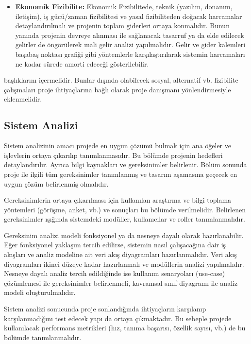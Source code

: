 \begin{itemize}
        \item \textbf{Ekonomik Fizibilite:} Ekonomik Fizibilitede, teknik (yazılım, donanım, iletişim), iş gücü/zaman fizibilitesi ve yasal fizibiliteden doğacak harcamalar detaylandırılmalı ve projenin toplam giderleri ortaya konmalıdır. Bunun yanında projenin devreye alınması ile sağlanacak tasarruf ya da elde edilecek gelirler de öngörülerek mali gelir analizi yapılmalıdır. Gelir ve gider kalemleri başabaş noktası grafiği gibi yöntemlerle karşılaştırılarak sistemin harcamaları ne kadar sürede amorti edeceği gösterilebilir.
        
    \end{itemize}

başlıklarını içermelidir. Bunlar dışında olabilecek sosyal, alternatif vb. fizibilite çalışmaları proje ihtiyaçlarına bağlı olarak proje danışmanı yönlendirmesiyle eklenmelidir.

\subsection{Sistem Analizi} 
Sistem analizinin amacı projede en uygun çözümü bulmak için ana öğeler ve işlevlerin ortaya çıkarılıp tanımlanmasıdır. Bu bölümde projenin hedefleri detaylandırılır. Ayrıca bilgi kaynakları ve gereksinimler belirlenir. Bölüm sonunda proje ile ilgili tüm gereksinimler tanımlanmış ve tasarım aşamasına geçecek en uygun çözüm belirlenmiş olmalıdır.
    
Gereksinimlerin ortaya çıkarılması için kullanılan araştırma ve bilgi toplama yöntemleri (görüşme, anket, vb.) ve sonuçları bu bölümde verilmelidir. Belirlenen gereksinimler ışığında sistemdeki modüller, kullanıcılar ve roller tanımlanmalıdır.

Gereksinim analizi modeli fonksiyonel ya da nesneye dayalı olarak hazırlanabilir. Eğer fonksiyonel yaklaşım tercih edilirse, sistemin nasıl çalışacağına dair iş akışları ve analiz modeline ait veri akış diyagramları hazırlanmalıdır. Veri akış diyagramları ikinci düzeye kadar hazırlanmalı ve modüllerin analizi yapılmalıdır. Nesneye dayalı analiz tercih edildiğinde ise kullanım senaryoları (use-case) çözümlemesi ile gereksinimler belirlenmeli, kavramsal sınıf diyagramı ile analiz modeli oluşturulmalıdır.

Sistem analizi sonucunda proje sonlandığında ihtiyaçların karşılanıp karşılanmadığını test edecek yapı da ortaya çıkmaktadır. Bu sebeple projede kullanılacak performans metrikleri (hız, tanıma başarısı, özellik sayısı, vb.) de bu bölümde tanımlanmalıdır.

